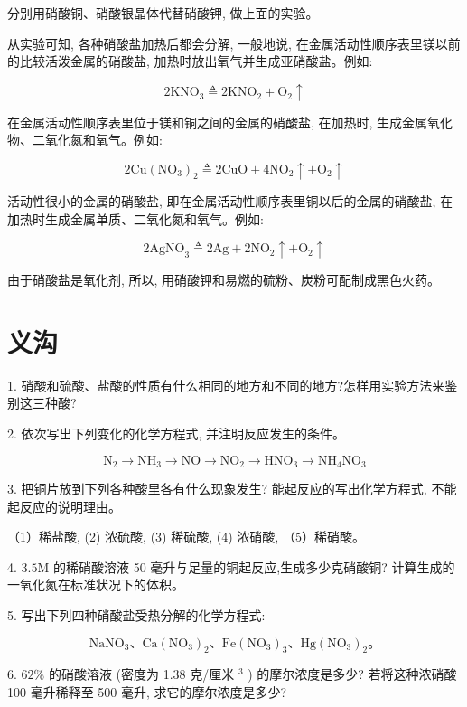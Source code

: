 \documentclass[10pt]{article}
\begin{document}
分别用硝酸铜、硝酸银晶体代替硝酸钾, 做上面的实验。

从实验可知, 各种硝酸盐加热后都会分解, 一般地说, 在金属活动性顺序表里镁以前的比较活泼金属的硝酸盐, 加热时放出氧气并生成亚硝酸盐。例如:

\[
2{\mathrm{{KNO}}}_{3} \triangleq 2{\mathrm{{KNO}}}_{2} + {\mathrm{O}}_{2} \uparrow
\]

在金属活动性顺序表里位于镁和铜之间的金属的硝酸盐, 在加热时, 生成金属氧化物、二氧化氮和氧气。例如:

\[
2\mathrm{{Cu}}{\left( {\mathrm{{NO}}}_{3}\right) }_{2} \triangleq 2\mathrm{{CuO}} + 4{\mathrm{{NO}}}_{2} \uparrow + {\mathrm{O}}_{2} \uparrow
\]

活动性很小的金属的硝酸盐, 即在金属活动性顺序表里铜以后的金属的硝酸盐, 在加热时生成金属单质、二氧化氮和氧气。例如:

\[
2{\mathrm{{AgNO}}}_{3} \triangleq 2\mathrm{{Ag}} + 2{\mathrm{{NO}}}_{2} \uparrow + {\mathrm{O}}_{2} \uparrow
\]

由于硝酸盐是氧化剂, 所以, 用硝酸钾和易燃的硫粉、炭粉可配制成黑色火药。

\section*{义沟}

1. 硝酸和硫酸、盐酸的性质有什么相同的地方和不同的地方?怎样用实验方法来鉴别这三种酸?

2. 依次写出下列变化的化学方程式, 并注明反应发生的条件。

\[
{\mathrm{N}}_{2} \rightarrow {\mathrm{{NH}}}_{3} \rightarrow \mathrm{{NO}} \rightarrow {\mathrm{{NO}}}_{2} \rightarrow {\mathrm{{HNO}}}_{3} \rightarrow {\mathrm{{NH}}}_{4}{\mathrm{{NO}}}_{3}
\]

3. 把铜片放到下列各种酸里各有什么现象发生? 能起反应的写出化学方程式, 不能起反应的说明理由。

（1）稀盐酸, (2) 浓硫酸, (3) 稀硫酸, (4) 浓硝酸, （5）稀硝酸。

4. \({3.5}\mathrm{M}\) 的稀硝酸溶液 50 毫升与足量的铜起反应,生成多少克硝酸铜? 计算生成的一氧化氮在标准状况下的体积。

5. 写出下列四种硝酸盐受热分解的化学方程式:

\[
{\mathrm{{NaNO}}}_{3}\text{、}\mathrm{{Ca}}{\left( {\mathrm{{NO}}}_{3}\right) }_{2}\text{、}\mathrm{{Fe}}{\left( {\mathrm{{NO}}}_{3}\right) }_{3}\text{、}\mathrm{{Hg}}{\left( {\mathrm{{NO}}}_{3}\right) }_{2}。
\]

6. \({62}\%\) 的硝酸溶液 (密度为 1.38 克/厘米 \({}^{3}\) ) 的摩尔浓度是多少? 若将这种浓硝酸 100 毫升稀释至 500 毫升, 求它的摩尔浓度是多少?
\end{document}
